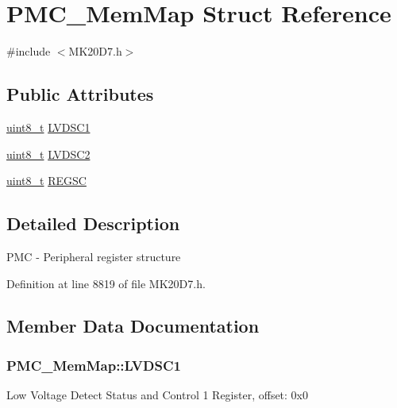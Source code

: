 \hypertarget{struct_p_m_c___mem_map}{}\section{P\+M\+C\+\_\+\+Mem\+Map Struct Reference}
\label{struct_p_m_c___mem_map}


{\ttfamily \#include $<$M\+K20\+D7.\+h$>$}

\subsection*{Public Attributes}
\begin{DoxyCompactItemize}
\item 
\hyperlink{_p_e___types_8h_aba7bc1797add20fe3efdf37ced1182c5}{uint8\+\_\+t} \hyperlink{struct_p_m_c___mem_map_aeed619ce4a5bf17bff6201b02deebb54}{L\+V\+D\+S\+C1}
\item 
\hyperlink{_p_e___types_8h_aba7bc1797add20fe3efdf37ced1182c5}{uint8\+\_\+t} \hyperlink{struct_p_m_c___mem_map_a934db8b39dae8b99a9a9165df50145f5}{L\+V\+D\+S\+C2}
\item 
\hyperlink{_p_e___types_8h_aba7bc1797add20fe3efdf37ced1182c5}{uint8\+\_\+t} \hyperlink{struct_p_m_c___mem_map_aa14a55a46cc237589d6c01ebf7676c2a}{R\+E\+G\+SC}
\end{DoxyCompactItemize}


\subsection{Detailed Description}
P\+MC -\/ Peripheral register structure 

Definition at line 8819 of file M\+K20\+D7.\+h.



\subsection{Member Data Documentation}
\subsubsection[{\texorpdfstring{L\+V\+D\+S\+C1}{LVDSC1}}]{ P\+M\+C\+\_\+\+Mem\+Map\+::\+L\+V\+D\+S\+C1}\hypertarget{struct_p_m_c___mem_map_aeed619ce4a5bf17bff6201b02deebb54}{}\label{struct_p_m_c___mem_map_aeed619ce4a5bf17bff6201b02deebb54}
Low Voltage Detect Status and Control 1 Register, offset\+: 0x0 

